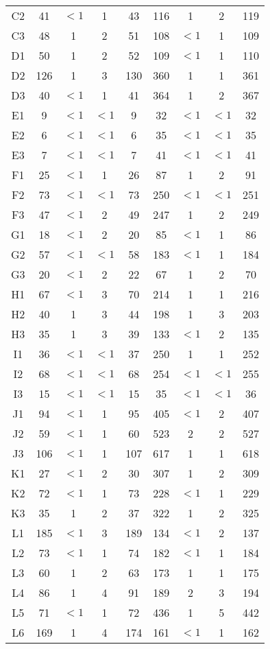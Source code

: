 \begin{center}
\begin{longtable}{ccccc|cccc}
C2&41&$<1$&1&43&116&1&2&119\\
C3&48&1&2&51&108&$<1$&1&109\\
D1&50&1&2&52&109&$<1$&1&110\\
D2&126&1&3&130&360&1&1&361\\
D3&40&$<1$&1&41&364&1&2&367\\
E1&9&$<1$&$<1$&9&32&$<1$&$<1$&32\\
E2&6&$<1$&$<1$&6&35&$<1$&$<1$&35\\
E3&7&$<1$&$<1$&7&41&$<1$&$<1$&41\\
F1&25&$<1$&1&26&87&1&2&91\\
F2&73&$<1$&$<1$&73&250&$<1$&$<1$&251\\
F3&47&$<1$&2&49&247&1&2&249\\
G1&18&$<1$&2&20&85&$<1$&1&86\\
G2&57&$<1$&$<1$&58&183&$<1$&1&184\\
G3&20&$<1$&2&22&67&1&2&70\\
H1&67&$<1$&3&70&214&1&1&216\\
H2&40&1&3&44&198&1&3&203\\
H3&35&1&3&39&133&$<1$&2&135\\
I1&36&$<1$&$<1$&37&250&1&1&252\\
I2&68&$<1$&$<1$&68&254&$<1$&$<1$&255\\
I3&15&$<1$&$<1$&15&35&$<1$&$<1$&36\\
J1&94&$<1$&1&95&405&$<1$&2&407\\
J2&59&$<1$&1&60&523&2&2&527\\
J3&106&$<1$&1&107&617&1&1&618\\
K1&27&$<1$&2&30&307&1&2&309\\
K2&72&$<1$&1&73&228&$<1$&1&229\\
K3&35&1&2&37&322&1&2&325\\
L1&185&$<1$&3&189&134&$<1$&2&137\\
L2&73&$<1$&1&74&182&$<1$&1&184\\
L3&60&1&2&63&173&1&1&175\\
L4&86&1&4&91&189&2&3&194\\
L5&71&$<1$&1&72&436&1&5&442\\
L6&169&1&4&174&161&$<1$&1&162\\
\end{longtable}
\end{center}

